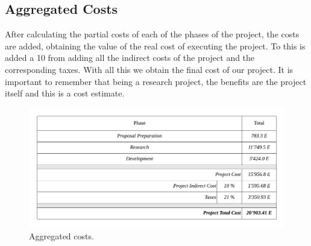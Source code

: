 \subsection{Aggregated Costs}
After calculating the partial costs of each of the phases of the project, the costs are added,
obtaining the value of the real cost of executing the project. To this is added a 10%
from adding all the indirect costs of the project and the corresponding taxes. With all this we
obtain the final cost of our project. It is important to remember that being a research project,
the benefits are the project itself and this is a cost estimate.

\begin{figure}[h!]
    \includegraphics[width=\textwidth]{images/budget-general.pdf}
    \centering
	\caption[Aggregated costs]{Aggregated costs.}
    \label{fig:budget-general}
\end{figure}